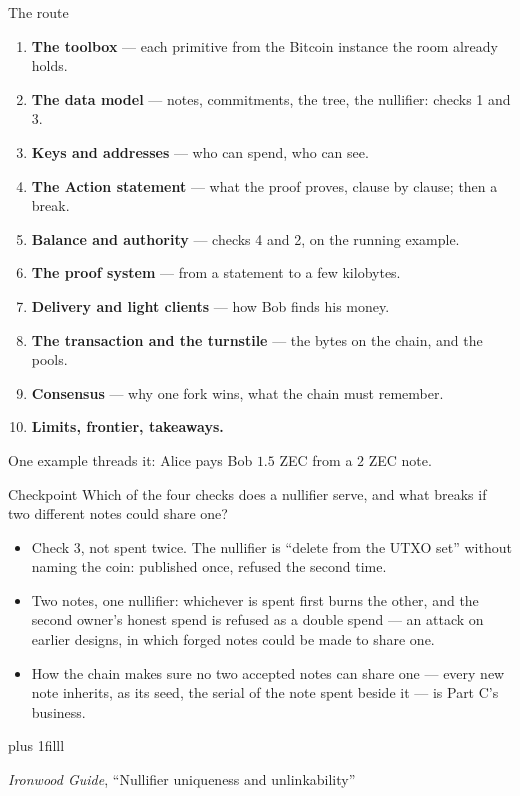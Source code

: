 \documentclass[aspectratio=169,11pt]{beamer}
\newcommand{\src}[1]{\par\vskip0pt plus 1filll
  {\fontsize{6}{7.2}\selectfont\color{arbdim}\raggedright #1\par}}
\begin{document}
\begin{frame}{The route}
\begin{enumerate}
  \item \textbf{The toolbox} --- each primitive from the Bitcoin instance
    the room already holds.
  \item \textbf{The data model} --- notes, commitments, the tree, the
    nullifier: checks 1 and 3.
  \item \textbf{Keys and addresses} --- who can spend, who can see.
  \item \textbf{The Action statement} --- what the proof proves, clause by
    clause; then a break.
  \item \textbf{Balance and authority} --- checks 4 and 2, on the running
    example.
  \item \textbf{The proof system} --- from a statement to a few kilobytes.
  \item \textbf{Delivery and light clients} --- how Bob finds his money.
  \item \textbf{The transaction and the turnstile} --- the bytes on the
    chain, and the pools.
  \item \textbf{Consensus} --- why one fork wins, what the chain must
    remember.
  \item \textbf{Limits, frontier, takeaways.}
\end{enumerate}
\medskip
One example threads it: Alice pays Bob $1.5$ ZEC from a $2$ ZEC note.
\end{frame}

\begin{frame}{Checkpoint}
{\large Which of the four checks does a nullifier serve, and what breaks if
two different notes could share one?}
\pause
\medskip
\begin{itemize}
  \item Check 3, not spent twice. The nullifier is ``delete from the UTXO
    set'' without naming the coin: published once, refused the second
    time.
  \item Two notes, one nullifier: whichever is spent first burns the other,
    and the second owner's honest spend is refused as a double spend ---
    an attack on earlier designs, in which forged notes could be made to
    share one.
  \item How the chain makes sure no two accepted notes can share one ---
    every new note inherits, as its seed, the serial of the note spent
    beside it --- is Part C's business.
\end{itemize}
\src{\emph{Ironwood Guide}, ``Nullifier uniqueness and unlinkability''}
\end{frame}
\end{document}
